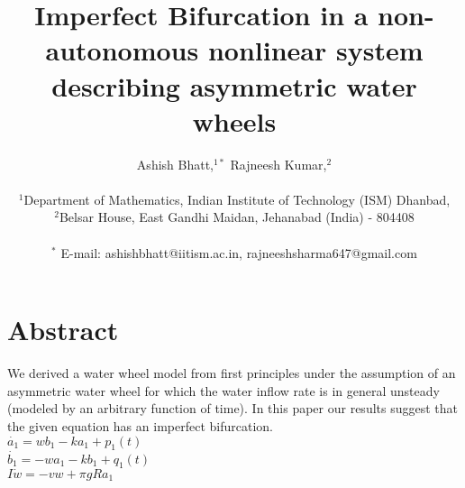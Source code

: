 \documentclass[12pt]{article}
\title{Imperfect Bifurcation in a non-autonomous nonlinear system describing asymmetric water wheels}
\author
{Ashish Bhatt,$^{1\ast}$ Rajneesh Kumar,$^{2}$\\
\\
\normalsize{$^{1}$Department of Mathematics, Indian Institute of Technology (ISM) Dhanbad,}\\
\normalsize{$^{2}$Belsar House, East Gandhi Maidan, Jehanabad (India) - 804408}\\
\\
\normalsize{$^\ast$ E-mail:  ashishbhatt@iitism.ac.in, rajneeshsharma647@gmail.com
}
}
\date{}
\begin{document}
 


\baselineskip24pt


\maketitle 








\section*{Abstract}

We derived a water wheel model from first principles under the assumption of an asymmetric water wheel for which the water inflow rate is in general unsteady (modeled by an arbitrary function of time). In this paper our results suggest that the given equation has an imperfect bifurcation.\\
$\dot{a_1}=wb_1-ka_1+p_1(t)$\\
$\dot{b_1}=-wa_1-kb_1+q_1(t)$\\
$I\dot{w}=-vw+ \pi gRa_1$
\end{document}
